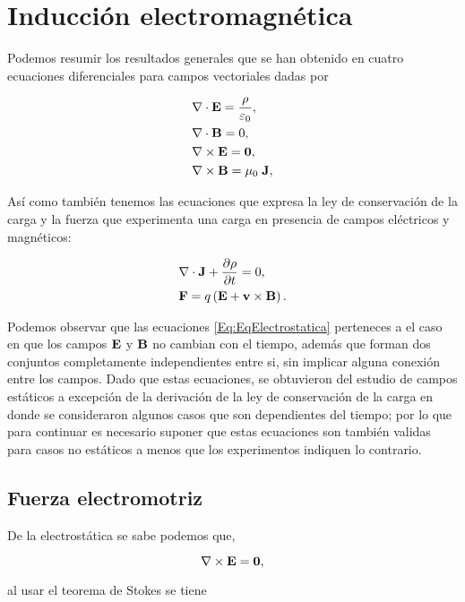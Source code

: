 \chapter{Inducción electromagnética}
Podemos resumir los resultados generales que se han obtenido en cuatro ecuaciones diferenciales para campos vectoriales dadas por

\begin{align}
	\label{Eq:EqElectrostatica}
	 & \nabla \cdot \textbf{E} = \frac{\rho}{\varepsilon_{0}}, \\
	 & \nabla \cdot \textbf{B} = 0,                            \\
	 & \nabla \times \textbf{E} = \textbf{0},                   \\
	 & \nabla \times \textbf{B} = \mu_{0}\; \textbf{J},
\end{align}

Así como también tenemos las ecuaciones que expresa la ley de conservación de la carga y la fuerza que experimenta una carga en presencia de campos eléctricos y magnéticos:

\begin{align}
	 & \divergence{\textbf{J}} + \diffp{\rho}{t} = 0,           \\
	 & \textbf{F} = q \left( \E + \textbf{v} \times \B \right).
\end{align}

Podemos observar que las ecuaciones \eqref{Eq:EqElectrostatica} perteneces a el caso en que los campos $\textbf{E}$ y $\textbf{B}$ no cambian con el tiempo, además que forman dos conjuntos completamente independientes entre si, sin implicar alguna conexión entre los campos. Dado que estas ecuaciones, se obtuvieron del estudio de campos estáticos a excepción de la derivación de la ley de conservación de la carga en donde se consideraron algunos casos que son dependientes del tiempo; por lo que para continuar es necesario suponer que estas ecuaciones son también validas para casos no estáticos a menos que los experimentos indiquen lo contrario.

\section{Fuerza electromotriz}
De la electrostática se sabe podemos que,

\begin{equation*}
	\nabla \times \textbf{E} = \textbf{0},
\end{equation*}

al usar el teorema de Stokes se tiene

